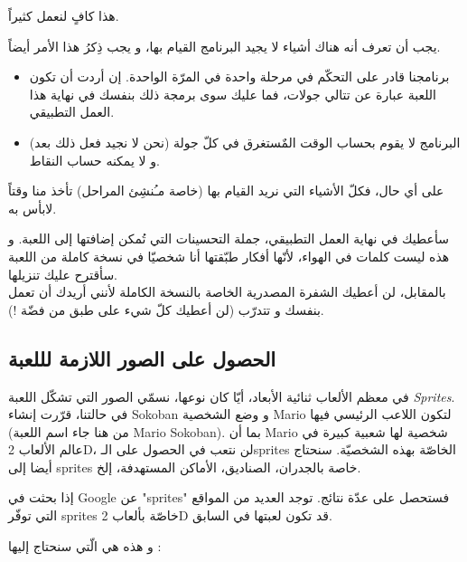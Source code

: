 هذا كافٍ لنعمل كثيراً.

يجب أن تعرف أنه هناك أشياء لا يجيد البرنامج القيام بها، و يجب ذِكرُ هذا الأمر أيضاً.

\begin{itemize}
	\item برنامجنا قادر على التحكّم في مرحلة واحدة في المرّة الواحدة. إن أردت أن تكون اللعبة عبارة عن تتالي جولات، فما عليك سوى برمجة ذلك بنفسك في نهاية هذا العمل التطبيقي.
	\item البرنامج لا يقوم بحساب الوقت المٌستغرق في كلّ جولة (نحن لا نجيد فعل ذلك بعد) و لا يمكنه حساب النقاط.
\end{itemize}

على أي حال، فكلّ الأشياء التي نريد القيام بها (خاصة مـُنشِئ المراحل) تأخذ منا وقتاً لابأس به.

\begin{information}
سأعطيك في نهاية العمل التطبيقي، جملة التحسينات التي تُمكن إضافتها إلى اللعبة. و هذه ليست كلمات في الهواء، لأنّها أفكار طبّقتها أنا شخصيّا في نسخة كاملة من اللعبة  سأقترح عليك تنزيلها.\\
بالمقابل، لن أعطيك الشفرة المصدرية الخاصة بالنسخة الكاملة لأنني أريدك أن تعمل بنفسك و تتدرّب (لن أعطيك كلّ شيء على طبق من فضّة !).
\end{information}

\subsection{الحصول على  الصور اللازمة لللعبة}

في معظم الألعاب ثنائية الأبعاد، أيّا كان نوعها، نسمّي الصور التي تشكّل اللعبة 
\textenglish{\textit{Sprites}}.\\
 في حالتنا، قرّرت إنشاء
\textenglish{Sokoban}
 و وضع الشخصية 
\textenglish{Mario}
لتكون اللاعب الرئيسي فيها (من هنا جاء اسم اللعبة 
\textenglish{Mario Sokoban}).
بما أن 
\textenglish{Mario}
شخصية لها شعبية كبيرة في عالم الألعاب 
\textenglish{2D}،
لن نتعب في الحصول على الـ\textenglish{sprites}
الخاصّة بهذه الشخصيّة. سنحتاج أيضا إلى
\textenglish{sprites}
خاصة بالجدران، الصناديق، الأماكن المستهدفة، إلخ.

إذا بحثت في
\textenglish{Google}
عن
"\textenglish{sprites}"
فستحصل على عدّة نتائج. توجد العديد من المواقع التي توفّر
\textenglish{sprites}
خاصّة بألعاب
\textenglish{2D}
قد تكون لعبتها في السابق.

و هذه هي الّتي سنحتاج إليها :

